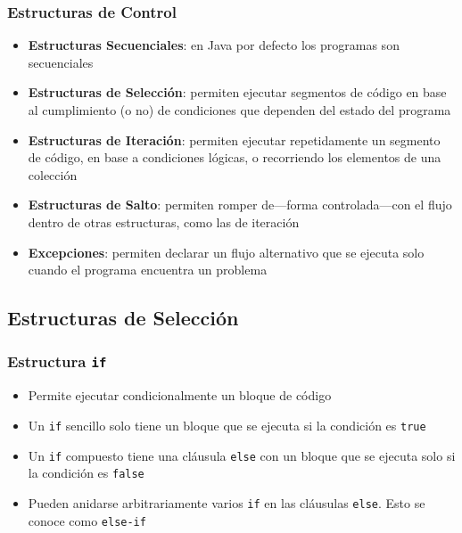 \documentclass{beamer}
\newcommand{\code}[1]{\texttt{#1}}
\begin{document}
\begin{frame}
  \frametitle{Estructuras de Control}

  \begin{small}
  \begin{itemize}
    
  \item \textbf{Estructuras Secuenciales}: en Java por defecto los programas
    son secuenciales
    
  \item \textbf{Estructuras de Selección}: permiten ejecutar segmentos de
    código en base al cumplimiento (o no) de condiciones que dependen
    del estado del programa
    
  \item \textbf{Estructuras de Iteración}: permiten ejecutar repetidamente un
    segmento de código, en base a condiciones lógicas, o recorriendo
    los elementos de una colección

    
  \item \textbf{Estructuras de Salto}: permiten romper de---forma
    controlada---con el flujo dentro de otras estructuras, como las de
    iteración
    
  \item \textbf{Excepciones}: permiten declarar un flujo alternativo
    que se ejecuta solo cuando el programa encuentra un problema
    
  \end{itemize}
  \end{small}

\end{frame}

\subsection{Estructuras de Selección}

\begin{frame}
  \frametitle{Estructura \code{if}}

  \begin{itemize}
  \item Permite ejecutar condicionalmente un bloque de código
    
  \item Un \code{if} sencillo solo tiene un bloque que se ejecuta si
    la condición es \code{true}
    
  \item Un \code{if} compuesto tiene una cláusula \code{else} con un
    bloque que se ejecuta solo si la condición es \code{false}
    
  \item Pueden anidarse arbitrariamente varios \code{if} en las
    cláusulas \code{else}. Esto se conoce como \code{else-if}
    
  \end{itemize}
\end{frame}
\end{document}
